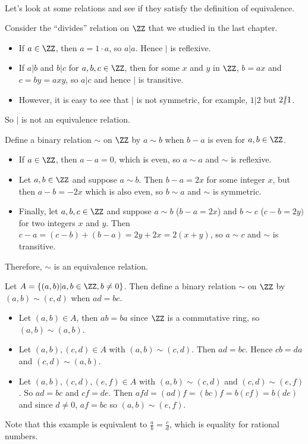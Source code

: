 \documentclass[../abstract_algebra.tex]{subfiles}
\begin{document}
        \paragraph{}
        Let's look at some relations and see if they satisfy the definition of equivalence.
        \begin{example}
            Consider the ``divides'' relation on $\ZZ$ that we studied in the last chapter.
            \begin{itemize}
                \item If $a\in\ZZ$, then $a=1\cdot a$, so $a|a$. Hence $|$ is reflexive.
                \item If $a|b$ and $b|c$ for $a,b,c\in\ZZ$, then for some $x$ and $y$ in $\ZZ$, $b=ax$ and $c=by=axy$, so $a|c$ and hence $|$ is transitive.
                \item However, it is easy to see that $|$ is not symmetric, for example, $1|2$ but $2\slashed{|}1$.
            \end{itemize}
            So $|$ is not an equivalence relation.
        \end{example}
        \begin{example}
            Define a binary relation $\sim $ on $\ZZ$ by $a\sim b$ when $b-a$ is even for $a,b\in\ZZ$.
            \begin{itemize}
                \item If $a\in\ZZ$, then $a-a=0$, which is even, so $a\sim a$ and $\sim $ is reflexive.
                \item Let $a,b\in\ZZ$ and suppose $a\sim b$. Then $b-a=2x$ for some integer $x$, but then $a-b=-2x$ which is also even, so $b\sim a$ and $\sim $ is symmetric.
                \item Finally, let $a,b,c\in\ZZ$ and suppose $a\sim b$ ($b-a=2x$) and $b\sim c$ ($c-b=2y)$ for two integers $x$ and $y$. Then $c-a=(c-b)+(b-a)=2y+2x=2(x+y)$, so $a\sim c$ and $\sim $ is transitive.
            \end{itemize}
            Therefore, $\sim $ is an equivalence relation.
        \end{example}
        \begin{example}
            Let $A=\{(a,b)|a,b\in\ZZ,b\neq0\}$. Then define a binary relation $\sim$ on $\ZZ$ by $(a,b)\sim(c,d)$ when $ad=bc$.
            \begin{itemize}
                \item Let $(a,b)\in A$, then $ab=ba$ since $\ZZ$ is a commutative ring, so $(a,b)\sim(a,b)$.
                \item Let $(a,b),(c,d)\in A$ with $(a,b)\sim(c,d)$. Then $ad=bc$. Hence $cb=da$ and $(c,d)\sim(a,b)$.
                \item Let $(a,b),(c,d),(e,f)\in A$ with $(a,b)\sim(c,d)$ and $(c,d)\sim(e,f)$. So $ad=bc$ and $cf=de$. Then $afd=(ad)f=(bc)f=b(cf)=b(de)$ and since $d\neq0$, $af=bc$ so $(a,b)\sim(e,f)$.
            \end{itemize}
            Note that this example is equivalent to $\frac{a}{b}=\frac{c}{d}$, which is equality for rational numbers.
        \end{example}
\end{document}
